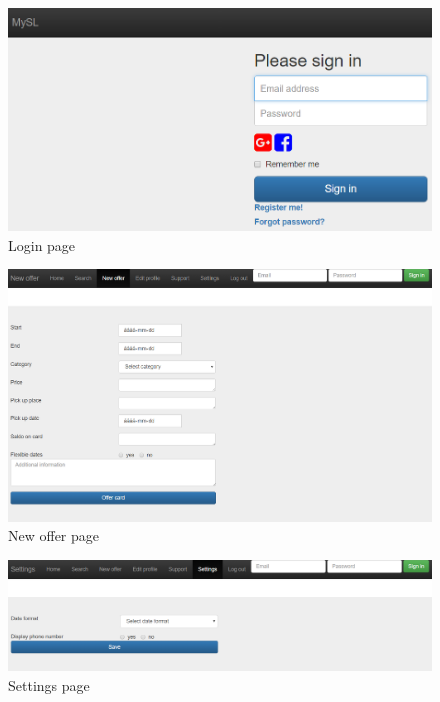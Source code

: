\documentclass[11pt,twoside,a4paper]{report}
\begin{document}
\begin{appendices}
\begin{figure}
	\centering
	\includegraphics[width=\textwidth]{png/webapp-login.png}
	\caption{Login page}
	\label{figure:login-page}
\end{figure}

\begin{figure}
	\centering
	\includegraphics[width=\textwidth]{png/webapp-newoffer.png}
	\caption{New offer page}
	\label{figure:new-offer-page}
\end{figure}

\begin{figure}
	\centering
	\includegraphics[width=\textwidth]{png/webapp-settings.png}
	\caption{Settings page}
	\label{figure:settings-page}
\end{figure}

\end{appendices}
\end{document}
